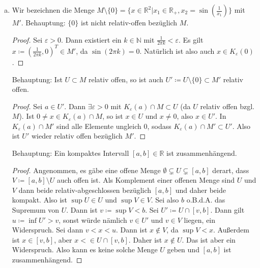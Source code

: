 \documentclass{article}
\theoremstyle{definition}
\newcommand{\N}{\mathbb{N}}
\newcommand{\R}{\mathbb{R}}
\renewcommand{\epsilon}{\varepsilon}
\begin{document}
\begin{enumerate}[(a)]
	\begin{proof}
		Angenommen das wäre nicht der Fall, dann gäbe es $\forall x\in \overline{K_\frac{1}{2}(\alpha)}\cap U$ eine Umgebung $K_\epsilon(x)$, sodass $K_\epsilon(x)\cap M \subset U$. Analog für $M\subset U$. Also gibt es zwei relativ-offene Mengen (bzgl. M) $A \coloneqq U \cap \overline{K_\frac{1}{2}(\alpha)}$ und $B \coloneqq (M\setminus U) \cap \overline{K_\frac{1}{2}(\alpha)}$, sodass $A \cup B = \overline{K_\frac{1}{2}(\alpha)}$. Das ist aber ein Widerspruch zu unserer ersten Behauptung.
	\end{proof}
	In jeder Umgebung von $\xi$ liegen also sowohl Punkte von $U$ als auch von $M\setminus U$. Da $U$ offen ist, kann also $\xi \notin U$ liegen. Also ist $\xi \in M\setminus U$. Folglich kann $M\setminus U$ nicht offen sein. Da $U$ beliebig war, gibt es keine relativ-offene Zerlegung $U, M\setminus U$ mit $\emptyset \neq U \neq M$.
	\item Wir bezeichnen die Menge $M \setminus \{0\} = \{x \in \R^2 | x_1 \in \R_+, x_2 = \sin\left(\frac{1}{x_1}\right)\}$ mit $M'$. Behauptung: $\{0\}$ ist nicht relativ-offen bezüglich $M$.
	\begin{proof}
		Sei $\epsilon > 0$. Dann existiert ein $k\in \N$ mit $\frac{1}{2\pi k} < \epsilon$. Es gilt $x \coloneqq \left(\frac{1}{2\pi k}, 0\right)^T\in M'$, da $\sin(2\pi k) = 0$. Natürlich ist also auch $x \in K_\epsilon(0)$.
	\end{proof}
	Behauptung: Ist $U\subset M$ relativ offen, so ist auch $U' \coloneqq U\setminus\{0\} \subset M'$ relativ offen.
	\begin{proof}
		Sei $a\in U'$. Dann $\exists \epsilon >0$ mit $K_\epsilon(a) \cap M \subset U$ (da $U$ relativ offen bzgl. $M$). Ist $0 \neq x\in K_\epsilon(a) \cap M$, so ist $x\in U$ und $x\neq 0$, also $x\in U'$. In $K_\epsilon(a) \cap M'$ sind alle Elemente ungleich 0, sodass $K_\epsilon(a) \cap M' \subset U'$. Also ist $U'$ wieder relativ offen bezüglich $M'$.
	\end{proof}
	Behauptung: Ein kompaktes Intervall $[a,b]\in \R$ ist zusammenhängend.
	\begin{proof}
		Angenommen, es gäbe eine offene Menge $\emptyset \subsetneq U \subsetneq [a,b]$ derart, dass $V \coloneqq [a,b]\setminus U$ auch offen ist. Als Komplement einer offenen Menge sind $U$ und $V$ dann beide relativ-abgeschlossen bezüglich $[a,b]$ und daher beide kompakt. Also ist $\sup U \in U$ und $\sup V \in V$. Sei also $b$ o.B.d.A. das Supremum von $U$. Dann ist $v \coloneqq \sup V < b$. Sei $U' \coloneqq U \cap [v,b]$. Dann gilt $u \coloneqq \inf U' > v$, sonst würde nämlich $v \in U'$ und $v\in V$ liegen, ein Widerspruch. Sei dann $v < x < u$. Dann ist $x \notin V$, da $\sup V < x$. Außerdem ist $x \in [v,b]$, aber $x < \in U\cap [v,b]$. Daher ist $x \notin U$. Das ist aber ein Widerspruch. Also kann es keine solche Menge $U$ geben und $[a,b]$ ist zusammenhängend.

\end{proof}
\end{enumerate}
\end{document}
